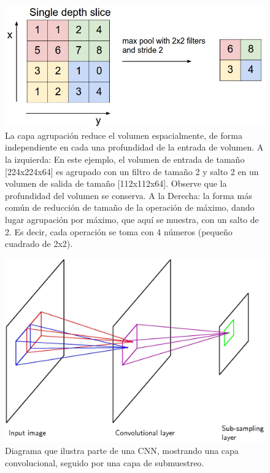 \documentclass[a4paper,11pt,spanish]{book}
\begin{document}
      \begin{figure}[H]
	\begin{center}
	  \includegraphics[width=0.8\linewidth]{./img/stanford_maxpool.jpeg}
	\end{center}
	\caption{La capa agrupación reduce el volumen espacialmente, de forma independiente en cada una profundidad de la entrada de volumen.
	  A la izquierda: En este ejemplo, el volumen de entrada de tamaño [224x224x64] es agrupado con un filtro de tamaño 2 y salto 2 en un volumen de salida de tamaño [112x112x64].
	  Observe que la profundidad del volumen se conserva. A la Derecha: la forma más común de reducción de tamaño de la operación de máximo, dando lugar agrupación por máximo,
	  que aquí se muestra, con un salto de 2. Es decir, cada operación se toma con 4 números (pequeño cuadrado de 2x2). \cite{Karpathy:Stanford}}
	\label{fig:maxpool_layer}
      \end{figure}
    
      \begin{figure}[h]
	\begin{center}
	\includegraphics[width=0.8\linewidth]{./img/bishop_cnn.jpg}
	\end{center}
	\caption{Diagrama que ilustra parte de una CNN, mostrando una capa convolucional, seguido por una capa de submuestreo.}
	\label{fig:bishop_cnn}
      \end{figure}
      
\end{document}
